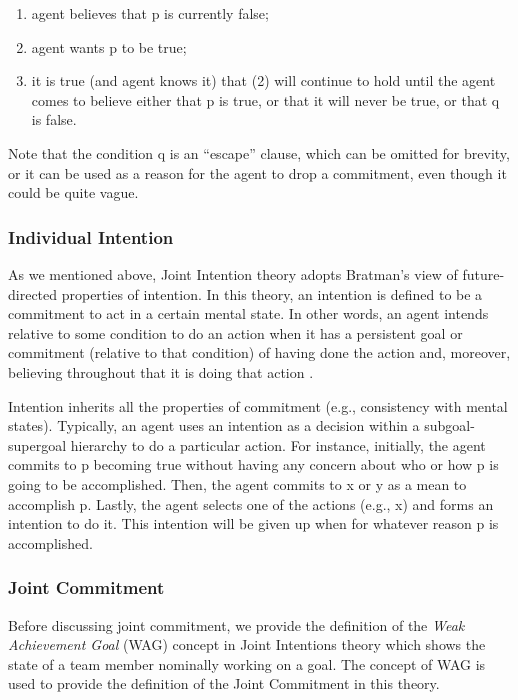 \documentclass[12pt]{report}
\begin{document}
\begin{enumerate}
  \item agent believes that p is currently false;
  \item agent wants p to be true;
  \item it is true (and agent knows it) that (2) will continue to hold until the
  agent comes to believe either that p is true, or that it will never be true,
  or that q is false.
\end{enumerate}

Note that the condition q is an ``escape'' clause, which can be omitted for
brevity, or it can be used as a reason for the agent to drop a commitment, even
though it could be quite vague.

\subsubsection{Individual Intention}
\label{sec:individual-intention}

As we mentioned above, Joint Intention theory adopts Bratman's view of
future-directed properties of intention. In this theory, an intention is defined
to be a commitment to act in a certain mental state. In other words, an agent
intends relative to some condition to do an action when it has a persistent goal
or commitment (relative to that condition) of having done the action and,
moreover, believing throughout that it is doing that action
\cite{cohen:teamwork}.

Intention inherits all the properties of commitment (e.g., consistency with
mental states). Typically, an agent uses an intention as a decision within a
subgoal-supergoal hierarchy to do a particular action. For instance, initially,
the agent commits to p becoming true without having any concern about who or
how p is going to be accomplished. Then, the agent commits to x or y as a mean
to accomplish p. Lastly, the agent selects one of the actions (e.g., x) and
forms an intention to do it. This intention will be given up when for whatever
reason p is accomplished.

\subsubsection{Joint Commitment}
\label{sec:jpg}

Before discussing joint commitment, we provide the definition of the
\textit{Weak Achievement Goal} (WAG) concept in Joint Intentions theory which
shows the state of a team member nominally working on a goal. The concept of WAG
is used to provide the definition of the Joint Commitment in this theory.\\
\end{document}
